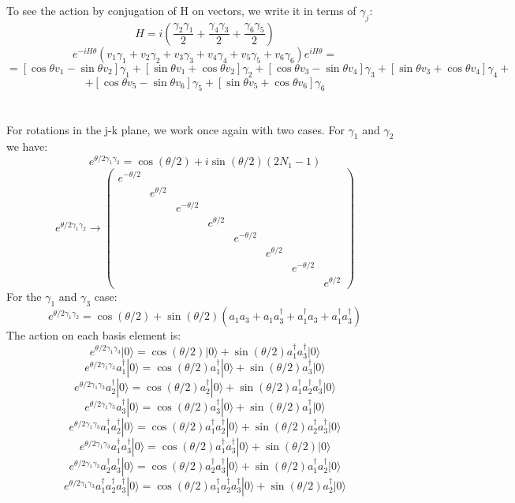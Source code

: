 \documentclass[12 pt]{article}
\begin{document}
To see the action by conjugation of H on vectors, we write it in terms of $\gamma_j$:
\[   H =  i \left(  \frac{\gamma_2\gamma_1}{2} + \frac{\gamma_4\gamma_3}{2} + \frac{\gamma_6\gamma_5}{2}  \right)       \]
\[    e^{-iH\theta} (v_1 \gamma_1 + v_2 \gamma_2 + v_3 \gamma_3 + v_4 \gamma_4 + v_5\gamma_5 + v_6\gamma_6) e^{iH\theta}  =   \]
\[  =     [\cos \theta v_1 - \sin\theta v_2 ]\gamma_1 + [\sin\theta v_1 + \cos\theta v_2] \gamma_2  +  [\cos \theta v_3 - \sin\theta v_4 ]\gamma_3 + [\sin\theta v_3 + \cos\theta v_4] \gamma_4 + \]
\[ +    [\cos \theta v_5 - \sin\theta v_6 ]\gamma_5 + [\sin\theta v_5 + \cos\theta v_6] \gamma_6       \]
\\
\\
For rotations in the j-k plane, we work once again with two cases. For $\gamma_1$ and $\gamma_2$ we have:
\[  e^{\theta/2 \gamma_1 \gamma_2} = \cos(\theta/2) + i \sin(\theta/2)  (2N_1 - 1)  \]
\[  e^{\theta/2 \gamma_1 \gamma_2} \to  \left( \begin{array} {cccccccc}     e^{-\theta/2} & & & & & & & \\ &e^{\theta/2} & & & & & & \\ & &e^{-\theta/2} & & & & & \\ & & & e^{\theta/2} & & & & \\ & & & &e^{-\theta/2} & & & \\ & & & & &e^{\theta/2} & & \\ & & & & & & e^{-\theta/2} & \\ & & & & & & & e^{\theta/2}     \end{array} \right)   \]
For the $\gamma_1$ and $\gamma_3$ case:
\[  e^{\theta/2 \gamma_1 \gamma_2} = \cos(\theta/2) +  \sin(\theta/2)  (a_1 a_3 + a_1a_3^{\dagger} + a_1^{\dagger}a_3 + a_1^{\dagger}a_3^{\dagger})  \]
The action on each basis element is:
\[  e^{\theta/2 \gamma_1 \gamma_3} |0\rangle = \cos(\theta/2) |0\rangle + \sin(\theta/2) a_1^{\dagger}a_3^{\dagger} |0\rangle \]
\[  e^{\theta/2 \gamma_1 \gamma_3} a_1^{\dagger}|0\rangle = \cos(\theta/2) a_1^{\dagger}|0\rangle + \sin(\theta/2) a_3^{\dagger} |0\rangle \]
\[  e^{\theta/2 \gamma_1 \gamma_3} a_2^{\dagger}|0\rangle = \cos(\theta/2) a_2^{\dagger}|0\rangle + \sin(\theta/2) a_1^{\dagger} a_2^{\dagger} a_3^{\dagger} |0\rangle \]
\[  e^{\theta/2 \gamma_1 \gamma_3} a_3^{\dagger}|0\rangle = \cos(\theta/2) a_3^{\dagger}|0\rangle + \sin(\theta/2) a_1^{\dagger} |0\rangle \]
\[  e^{\theta/2 \gamma_1 \gamma_3} a_1^{\dagger}a_2^{\dagger}|0\rangle = \cos(\theta/2) a_1^{\dagger}a_2^{\dagger}|0\rangle + \sin(\theta/2) a_2^{\dagger}a_3^{\dagger} |0\rangle \]
\[  e^{\theta/2 \gamma_1 \gamma_3} a_1^{\dagger}a_3^{\dagger}|0\rangle = \cos(\theta/2) a_1^{\dagger}a_3^{\dagger}|0\rangle + \sin(\theta/2) |0\rangle \]
\[  e^{\theta/2 \gamma_1 \gamma_3} a_2^{\dagger}a_3^{\dagger}|0\rangle = \cos(\theta/2) a_2^{\dagger}a_3^{\dagger}|0\rangle + \sin(\theta/2) a_1^{\dagger}a_2^{\dagger} |0\rangle \]
\[  e^{\theta/2 \gamma_1 \gamma_3} a_1^{\dagger}a_2^{\dagger}a_3^{\dagger}|0\rangle = \cos(\theta/2) a_1^{\dagger}a_2^{\dagger}a_3^{\dagger}|0\rangle + \sin(\theta/2) a_2^{\dagger} |0\rangle \]
\end{document}
